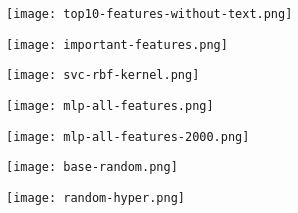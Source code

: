\begin{figure}[h]
  \centering
  \texttt{[image: top10-features-without-text.png]}
  \caption{}
  \label{fig:top10-features-without-text}
\end{figure}

\begin{figure}[h]
  \centering
  \texttt{[image: important-features.png]}
  \caption{}
  \label{fig:important-features}
\end{figure}

\begin{figure}[h]
  \centering
  \texttt{[image: svc-rbf-kernel.png]}
  \caption{}
  \label{fig:svc-rbf-kernel}
\end{figure}

\begin{figure}[h]
  \centering
  \texttt{[image: mlp-all-features.png]}
  \caption{}
  \label{fig:mlp-all-features}
\end{figure}

\begin{figure}[h]
  \centering
  \texttt{[image: mlp-all-features-2000.png]}
  \caption{}
  \label{fig:mlp-all-features-2000}
\end{figure}

\begin{figure}[h]
  \centering
  \texttt{[image: base-random.png]}
  \caption{}
  \label{fig:base-random}
\end{figure}

\begin{figure}[h]
  \centering
  \texttt{[image: random-hyper.png]}
  \caption{}
  \label{fig:random-hyper}
\end{figure}
